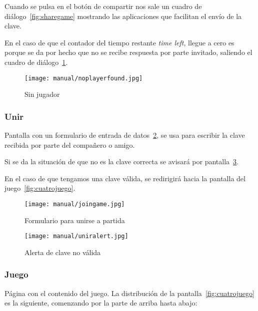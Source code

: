 Cuando se pulsa en el botón de compartir nos sale un cuadro de diálogo~\ref{fig:sharegame} mostrando las aplicaciones que facilitan el envío de la clave.

En el caso de que el contador del tiempo restante \emph{time left}, llegue a cero es porque se da por hecho que no se recibe respuesta por parte invitado, saliendo el cuadro de diálogo~\ref{fig:noplayerfound}.

\begin{figure}[H]
	\centering
	\texttt{[image: manual/noplayerfound.jpg]}
	\caption{Sin jugador}\label{fig:noplayerfound}
\end{figure}

\subsubsection{Unir}\label{cuatrounir}
Pantalla con un formulario de entrada de datos~\ref{fig:cuatrounir}, se usa para escribir la clave recibida por parte del compañero o amigo. 

Si se da la situación de que no es la clave correcta se avisará por pantalla~\ref{fig:uniralert}.

En el caso de que tengamos una clave válida, se redirigirá hacia la pantalla del juego~\ref{fig:cuatrojuego}.

\begin{figure}[H]
	\centering
	\texttt{[image: manual/joingame.jpg]}
	\caption{Formulario para unirse a partida}\label{fig:cuatrounir}
\end{figure}

\begin{figure}[H]
	\centering
	\texttt{[image: manual/uniralert.jpg]}
	\caption{Alerta de clave no válida}\label{fig:uniralert}
\end{figure}

\subsubsection{Juego}\label{cuatrojuego}
Página con el contenido del juego. La distribución de la pantalla~\ref{fig:cuatrojuego} es la siguiente, comenzando por la parte de arriba hasta abajo:

